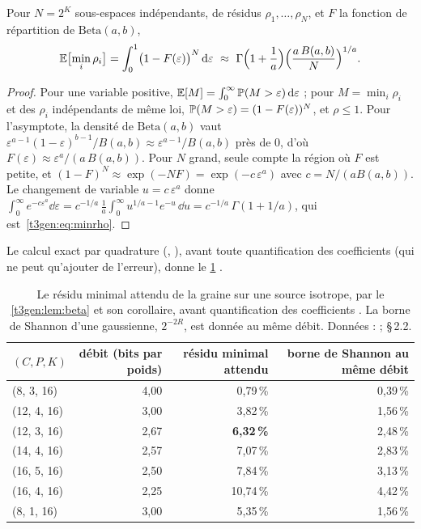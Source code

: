 \begin{corollaire}\label{t3gen:cor:beta}
Pour $N = 2^K$ sous-espaces indépendants, de résidus $\rho_1, \ldots, \rho_N$, et $F$ la fonction de répartition de $\mathrm{Beta}(a, b)$,
\begin{equation}\label{t3gen:eq:minrho}
\mathbb{E}\bigl[\min_i \rho_i\bigr] = \int_0^1 \bigl(1 - F(\varepsilon)\bigr)^N\, \mathrm{d}\varepsilon \ \approx\ \Gamma\Bigl(1 + \frac1a\Bigr) \Bigl(\frac{a\, B(a, b)}{N}\Bigr)^{1/a} .
\end{equation}
\end{corollaire}

\begin{proof}
Pour une variable positive, $\mathbb{E}[M] = \int_0^\infty \mathbb{P}(M > \varepsilon)\,\mathrm{d}\varepsilon$ ; pour $M = \min_i \rho_i$ et des $\rho_i$ indépendants de même loi, $\mathbb{P}(M > \varepsilon) = (1 - F(\varepsilon))^N$, et $\rho \le 1$. Pour l'asymptote, la densité de $\mathrm{Beta}(a, b)$ vaut $\varepsilon^{a-1}(1-\varepsilon)^{b-1}/B(a,b) \approx \varepsilon^{a-1}/B(a,b)$ près de 0, d'où $F(\varepsilon) \approx \varepsilon^a / (a\, B(a,b))$. Pour $N$ grand, seule compte la région où $F$ est petite, et $(1 - F)^N \approx \exp(-N F) = \exp(-c\, \varepsilon^a)$ avec $c = N/(a B(a,b))$. Le changement de variable $u = c\,\varepsilon^a$ donne $\int_0^\infty e^{-c\varepsilon^a}\dd\varepsilon = c^{-1/a}\,\frac1a \int_0^\infty u^{1/a - 1} e^{-u}\,\dd u = c^{-1/a}\,\Gamma(1 + 1/a)$, qui est~\eqref{t3gen:eq:minrho}.
\end{proof}

Le calcul exact par quadrature (, ), avant toute quantification des coefficients (qui ne peut qu'ajouter de l'erreur), donne le \cref{t3gen:tab:theorie} \calc.

\begin{table}[tbp]
\centering\small
\begin{tabular}{l r r r}
\toprule
$(C, P, K)$ & débit (bits par poids) & résidu minimal attendu & borne de Shannon au même débit \\
\midrule
(8, 3, 16) & 4,00 & 0,79\,\% & 0,39\,\% \\
(12, 4, 16) & 3,00 & 3,82\,\% & 1,56\,\% \\
(12, 3, 16) & 2,67 & \textbf{6,32\,\%} & 2,48\,\% \\
(14, 4, 16) & 2,57 & 7,07\,\% & 2,83\,\% \\
(16, 5, 16) & 2,50 & 7,84\,\% & 3,13\,\% \\
(16, 4, 16) & 2,25 & 10,74\,\% & 4,42\,\% \\
(8, 1, 16) & 3,00 & 5,35\,\% & 1,56\,\% \\
\bottomrule
\end{tabular}
\caption[La graine prédite par le lemme 1]{Le résidu minimal attendu de la graine sur une source isotrope, par le \cref{t3gen:lem:beta} et son corollaire, avant quantification des coefficients \calc. La borne de Shannon d'une gaussienne, $2^{-2R}$, est donnée au même débit. Données :  ;  §\,2.2.}
\label{t3gen:tab:theorie}
\end{table}

